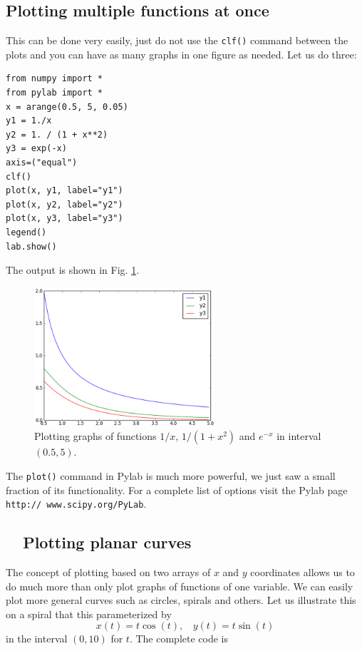 \subsection{Plotting multiple functions at once}

This can be done very easily, just do not use the {\tt clf()}
command between the plots and you can have as many graphs 
in one figure as needed. Let us do three:

\begin{verbatim}
from numpy import *
from pylab import *
x = arange(0.5, 5, 0.05)
y1 = 1./x
y2 = 1. / (1 + x**2)
y3 = exp(-x)
axis=("equal")
clf()
plot(x, y1, label="y1")
plot(x, y2, label="y2")
plot(x, y3, label="y3")
legend()
lab.show()
\end{verbatim}
\noindent
The output is shown in Fig. \ref{fig:plot7}.
\newpage

\begin{figure}[!ht]
\begin{center}
\includegraphics[width=0.6\textwidth]{imgp/plot7.png}
\end{center}
\vspace{-4mm}
\caption{Plotting graphs of functions $1/x$, $1 / (1 + x^2)$ and $e^{-x}$ in interval $(0.5, 5)$.}
\label{fig:plot7}
\vspace{-2mm}
\end{figure}
\noindent
The {\tt plot()} command in Pylab is much more powerful, we just saw a small 
fraction of its functionality. For a complete list of options 
visit the Pylab page {\tt http:// www.scipy.org/PyLab}.

\subsection{\ \ Plotting planar curves}

The concept of plotting based on two arrays of $x$ and $y$ coordinates
allows us to do much more than only plot graphs of functions of one variable.
We can easily plot more general curves such as circles, spirals and others.
Let us illustrate this on a spiral that this parameterized 
by 
$$
x(t) = t \cos(t), \ \ \ \ 
y(t) = t \sin(t)
$$ 
in the interval $(0, 10)$ for $t$. The complete code is

